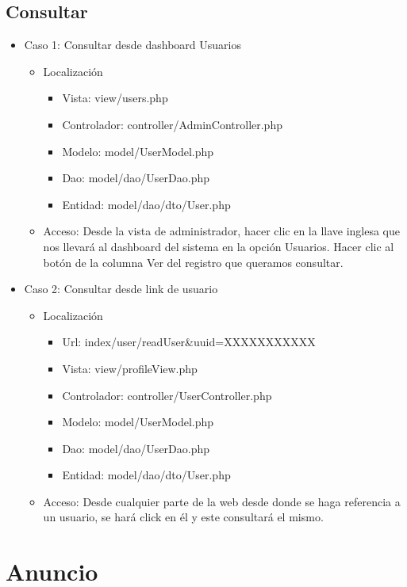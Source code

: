 \subsection{Consultar}
\begin{itemize}
\item Caso 1: Consultar desde dashboard Usuarios
\begin{itemize}
\item Localizaci\'{o}n
\begin{itemize}
\item Vista: view/users.php
\item Controlador: controller/AdminController.php
\item Modelo: model/UserModel.php
\item Dao: model/dao/UserDao.php
\item Entidad: model/dao/dto/User.php
\end{itemize}
\item Acceso: Desde la vista de administrador, hacer clic en la llave inglesa que nos llevar\'{a} al dashboard del sistema en la opci\'{o}n Usuarios. Hacer clic al bot\'{o}n de la columna Ver del registro que queramos consultar.
\end{itemize}
\item Caso 2: Consultar desde link de usuario
\begin{itemize}
\item Localizaci\'{o}n
\begin{itemize}
\item Url: index/user/readUser\&uuid=XXXXXXXXXXX
\item Vista: view/profileView.php
\item Controlador: controller/UserController.php
\item Modelo: model/UserModel.php
\item Dao: model/dao/UserDao.php
\item Entidad: model/dao/dto/User.php
\end{itemize}
\item Acceso: Desde cualquier parte de la web desde donde se haga referencia a un usuario, se har\'{a} click en \'{e}l y este consultar\'{a} el mismo.
\end{itemize}
\end{itemize}

\section{Anuncio}
